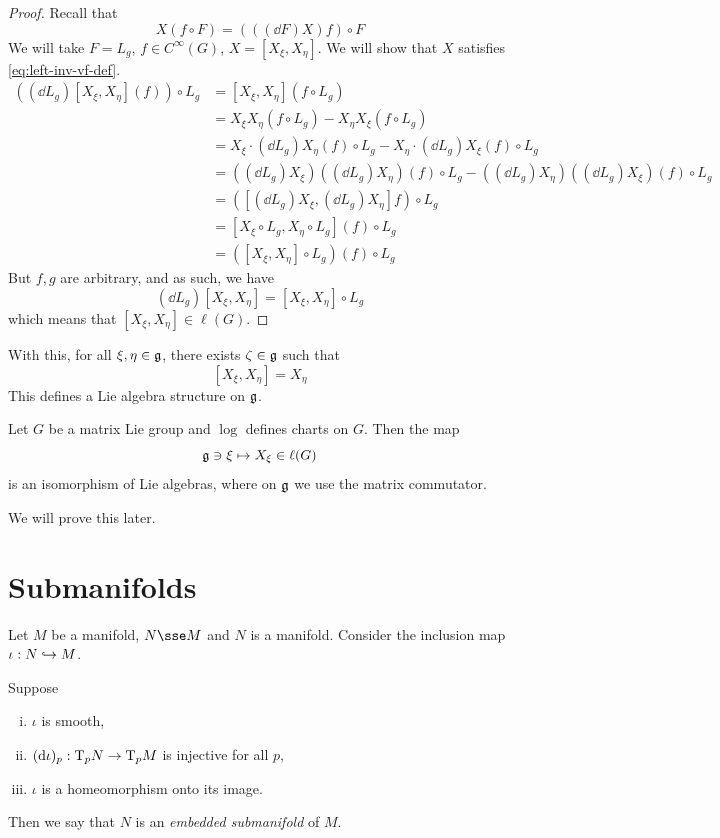 \documentclass{article}
\begin{document}
\begin{proof}
    Recall that
    \[X(f \circ F) = \left(\left((\dd F)X\right)f\right) \circ F\]
    We will take \(F = L_g\), \(f \in C^\infty(G)\), \(X = [X_\xi, X_\eta]\). We will show that \(X\) satisfies \cref{eq:left-inv-vf-def}.
    \begin{align*}
        \left((\dd L_g)[X_\xi, X_\eta](f)\right)\circ L_g &= [X_\xi, X_\eta](f \circ L_g) \\
        &= X_\xi X_\eta (f \circ L_g) - X_\eta X_\xi(f \circ L_g) \\
        &= X_\xi \cdot (\dd L_g)X_\eta(f) \circ L_g -  X_\eta \cdot (\dd L_g)X_\xi(f) \circ L_g \\
        &= ((\dd L_g)X_\xi)((\dd L_g)X_\eta)(f) \circ L_g - ((\dd L_g)X_\eta)((\dd L_g)X_\xi)(f) \circ L_g \\
        &= ([(\dd L_g)X_\xi, (\dd L_g)X_\eta]f) \circ L_g \\
        &= [X_\xi \circ L_g, X_\eta \circ L_g](f) \circ L_g \\
        &= ([X_\xi, X_\eta] \circ L_g)(f) \circ L_g
    \end{align*}
    But \(f, g\) are arbitrary, and as such, we have
    \[(\dd L_g)[X_\xi, X_\eta] = [X_\xi, X_\eta] \circ L_g\]
    which means that \([X_\xi, X_\eta] \in \ell(G)\).
\end{proof}

With this, for all \(\xi, \eta \in \mathfrak{g}\), there exists \(\zeta \in \mathfrak{g}\) such that
\[[X_\xi, X_\eta] = X_\eta\]
This defines a Lie algebra structure on \(\mathfrak{g}\).

\begin{theorem}
    \label{thm:matrix-lie-group-lie-alg-iso}
    Let \(G\) be a matrix Lie group and \(\log\) defines charts on \(G\). Then the map
    \[\mathfrak{g} \ni \xi \mapsto X_\xi \in \ell(G)\]
    is an isomorphism of Lie algebras, where on \(\mathfrak{g}\) we use the matrix commutator.
\end{theorem}

We will prove this later.

\section{Submanifolds}

Let \(M\) be a manifold, \(N \sse M\) and \(N\) is a manifold. Consider the inclusion map \(\iota : N \hookrightarrow M\).

\begin{definition}
    Suppose
    \begin{enumerate}[(i)]
        \item \(\iota\) is smooth,
        \item \((\dd \iota)_p : \mathrm{T}_p N \to \mathrm{T}_pM\) is injective for all \(p\),
        \item \(\iota\) is a homeomorphism onto its image.
    \end{enumerate}
    Then we say that \(N\) is an \emph{embedded submanifold} of \(M\).
\end{definition}
\end{document}
